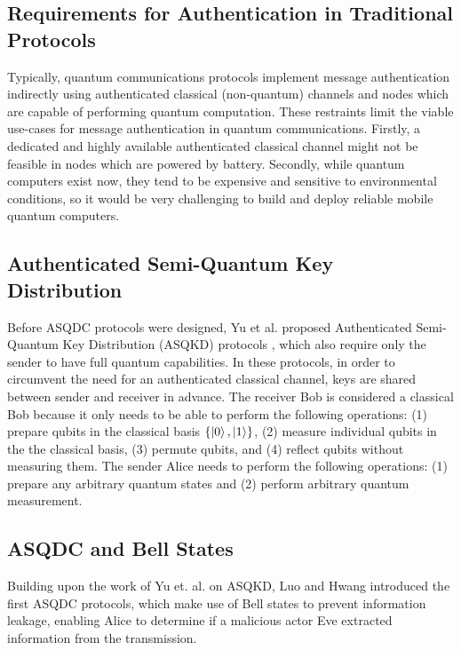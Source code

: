 \documentclass[conference,compsoc]{IEEEtran}
\begin{document}
\subsection{Requirements for Authentication in Traditional Protocols}

Typically, quantum communications protocols implement message
authentication indirectly using authenticated classical (non-quantum)
channels and nodes which are capable of performing quantum computation.
These restraints limit the viable use-cases for message authentication
in quantum communications. Firstly, a dedicated and highly available
authenticated classical channel might not be feasible in nodes which are
powered by battery. Secondly, while quantum computers exist now, they tend
to be expensive and sensitive to environmental conditions, so it would be very
challenging to build and deploy reliable mobile quantum computers.

\subsection{Authenticated Semi-Quantum Key Distribution}

Before ASQDC protocols were designed, Yu et al. proposed Authenticated
Semi-Quantum Key Distribution (ASQKD) protocols \cite{YuEtAl}, which also
require only the sender to have full quantum capabilities. In these protocols,
in order to circumvent the need for an authenticated classical channel,
keys are shared between sender and receiver in advance. The receiver Bob is
considered a classical Bob because it only needs
to be able to perform the following operations: (1) prepare qubits
in the classical basis $\left\{ \ket{0} ,\ket{1} \right\} $,
(2) measure individual qubits in the the classical basis, (3) permute
qubits, and (4) reflect qubits without measuring them. The sender Alice needs
to perform the following operations: (1) prepare any arbitrary quantum states and
(2) perform arbitrary quantum measurement.

\subsection{ASQDC and Bell States}

Building upon the work of Yu et. al. on ASQKD, Luo and Hwang introduced the first
ASQDC protocols, which make use of Bell states to prevent information leakage,
enabling Alice to determine if a malicious actor Eve extracted
information from the transmission.
\end{document}
